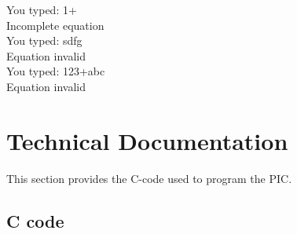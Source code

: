 \documentclass[11pt]{article}
\begin{document}
You typed: 1+ \\
Incomplete equation \\

You typed: sdfg \\
Equation invalid \\

You typed: 123+abc \\ 
Equation invalid \\


\section{Technical Documentation}

This section provides the C-code used to program the PIC.

\subsection{C code}
\end{document}

